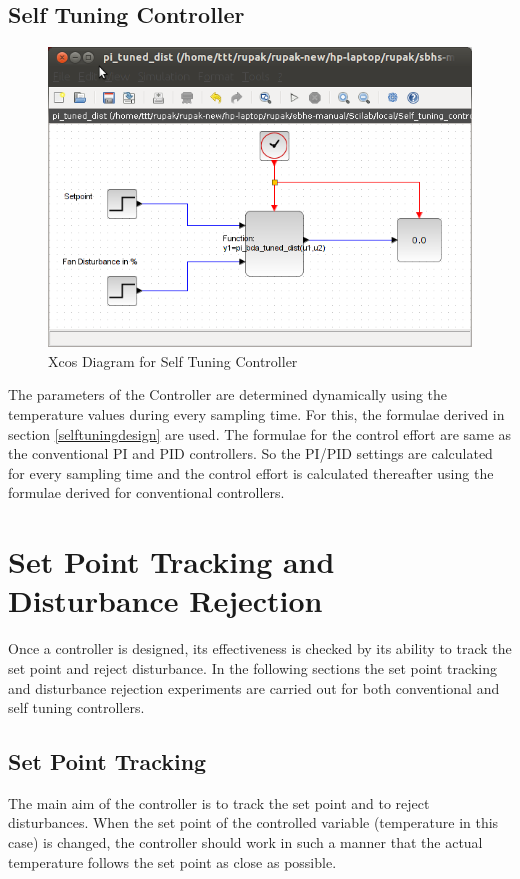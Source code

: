 \subsection{Self Tuning Controller}
\begin{figure}[h]
\centering
	\includegraphics[width = \textwidth]{Vikas_self/report_tex/implementation/pi_dist_self.png}
		\caption{Xcos Diagram for Self Tuning Controller}
	\label{selftuning}
\end{figure}

The parameters of the Controller are determined dynamically using the temperature values during every sampling time. For this, the formulae derived in section \ref{selftuningdesign} are used. The formulae for the control effort are same as the conventional PI and PID controllers. So the PI/PID settings are calculated for every sampling time and the control effort is calculated thereafter using the formulae derived for conventional controllers.
%
%
%
	
\section{Set Point Tracking and Disturbance Rejection}
Once a controller is designed, its effectiveness is checked by its ability to track the set point and reject disturbance. In the following sections the set point tracking and disturbance rejection experiments are carried out for both conventional and self tuning controllers.  

\subsection{Set Point Tracking}
The main aim of the controller is to track the set point and to reject disturbances. When the set point of the controlled variable (temperature in this case) is changed, the controller should work in such a manner that the actual temperature follows the set point as close as possible.\\

